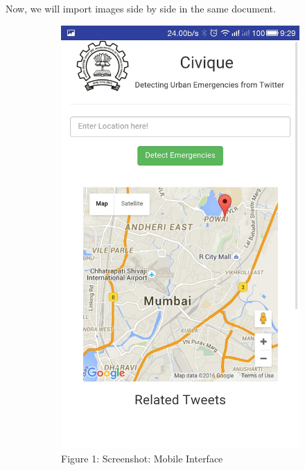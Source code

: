 \documentclass[12pt]{article}
\begin{document}
\hspace{1.5 ex} \hspace{2 ex} Now, we will import images side by side in the same document.
\begin{figure}[!h]
\begin{subfigure}[t]{.37\textwidth}
  \centering
  \includegraphics[width=.65\linewidth]{1}
  \caption*{Figure 1: Screenshot: Mobile
Interface}
  \label{fig:sub1}
\end{subfigure}%
\begin{subfigure}[t]{.37\textwidth}
  \centering

\end{subfigure}
\end{figure}
\end{document}
